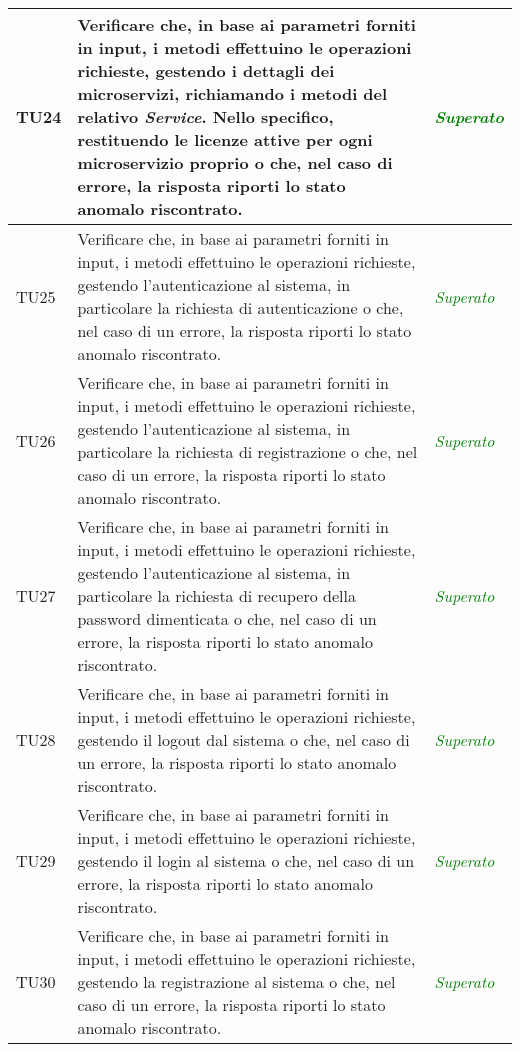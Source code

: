 \begin{longtable}{|>{\centering\arraybackslash}p{1.5cm}|>{\centering\arraybackslash}p{8cm} | >{\centering\arraybackslash}p{3.8cm}|}
		\hypertarget{TU24}{TU24} & Verificare che, in base ai parametri forniti in input, i metodi effettuino le operazioni richieste, gestendo i dettagli dei microservizi, richiamando i metodi del relativo \textit{Service}. Nello specifico, restituendo le licenze attive per ogni microservizio proprio o che, nel caso di errore, la risposta riporti lo stato anomalo riscontrato. & \textcolor{Green}{\textit{Superato}}\\ \hline
		\hypertarget{TU25}{TU25} & Verificare che, in base ai parametri forniti in input, i metodi effettuino le operazioni richieste, gestendo l'autenticazione al sistema, in particolare la richiesta di autenticazione o che, nel caso di un errore, la risposta riporti lo stato anomalo riscontrato. & \textcolor{Green}{\textit{Superato}}\\ \hline
		\hypertarget{TU26}{TU26} & Verificare che, in base ai parametri forniti in input, i metodi effettuino le operazioni richieste, gestendo l'autenticazione al sistema, in particolare la richiesta di registrazione o che, nel caso di un errore, la risposta riporti lo stato anomalo riscontrato. & \textcolor{Green}{\textit{Superato}}\\ \hline
		\hypertarget{TU27}{TU27} & Verificare che, in base ai parametri forniti in input, i metodi effettuino le operazioni richieste, gestendo l'autenticazione al sistema, in particolare la richiesta di recupero della password dimenticata o che, nel caso di un errore, la risposta riporti lo stato anomalo riscontrato. & \textcolor{Green}{\textit{Superato}}\\ \hline
		\hypertarget{TU28}{TU28} & Verificare che, in base ai parametri forniti in input, i metodi effettuino le operazioni richieste, gestendo il logout dal sistema o che, nel caso di un errore, la risposta riporti lo stato anomalo riscontrato. & \textcolor{Green}{\textit{Superato}}\\ \hline
		\hypertarget{TU29}{TU29} & Verificare che, in base ai parametri forniti in input, i metodi effettuino le operazioni richieste, gestendo il login al sistema o che, nel caso di un errore, la risposta riporti lo stato anomalo riscontrato. & \textcolor{Green}{\textit{Superato}}\\ \hline
		\hypertarget{TU30}{TU30} & Verificare che, in base ai parametri forniti in input, i metodi effettuino le operazioni richieste, gestendo la registrazione al sistema o che, nel caso di un errore, la risposta riporti lo stato anomalo riscontrato. & \textcolor{Green}{\textit{Superato}}\\ \hline

\end{longtable}
